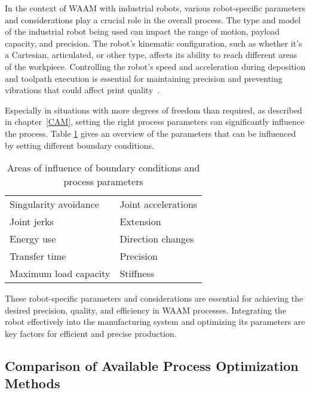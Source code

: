 \documentclass[ZLstudentexpose%
              ,optBiber%
              ,optEnglish%
              ,10pt
              ]{ZLlatex}%
\begin{document}
In the context of WAAM with industrial robots, various robot-specific parameters and considerations play a crucial role in the overall process. The type and model of the industrial robot being used can impact the range of motion, payload capacity, and precision. The robot's kinematic configuration, such as whether it's a Cartesian, articulated, or other type, affects its ability to reach different areas of the workpiece. Controlling the robot's speed and acceleration during deposition and toolpath execution is essential for maintaining precision and preventing vibrations that could affect print quality~\cite{Hsiao.2020}.

Especially in situations with more degrees of freedom than required, as described in chapter~\ref{CAM}, setting the right process parameters can significantly influence the process.
Table \ref{parameter} gives an overview of the parameters that can be influenced by setting different boundary conditions.

\begin{table} [h!]
\centering
\begin{tabular}{|l|l|}
\hline
\hline
Singularity avoidance \cite{Huo.2008b} & Joint accelerations \cite{Gasparetto.2010}\\
Joint jerks \cite{Gasparetto.2010} & Extension \\
Energy use \cite{Paryanto.2015} & Direction changes \cite{Halbauer.2013}\\
Transfer time \cite{Hirzinger.2005} & Precision \cite{Pham.2018}\\
Maximum load capacity \cite{Breaz.2017} & Stiffness \cite{Cvitanic.2020}\\
\hline
\hline

\end{tabular}


\caption{Areas of influence of boundary conditions and process parameters}
\label{parameter}
\end{table}
\newpage
These robot-specific parameters and considerations are essential for achieving the desired precision, quality, and efficiency in WAAM processes. Integrating the robot effectively into the manufacturing system and optimizing its parameters are key factors for efficient and precise production.

\subsection{Comparison of Available Process Optimization Methods}
\end{document}
